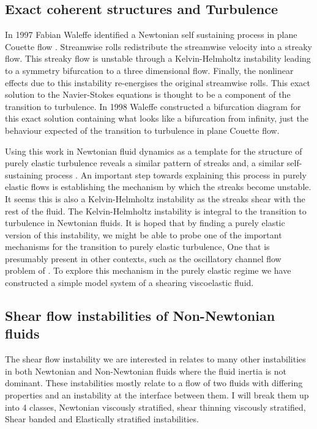 \documentclass{jfm}
\begin{document}
\subsection{Exact coherent structures and Turbulence}

In 1997 Fabian Waleffe identified a Newtonian self sustaining process in plane
Couette flow \citep{Waleffe1997}. Streamwise rolls redistribute the streamwise
velocity into a streaky flow. This streaky flow is unstable through a
Kelvin-Helmholtz instability leading to a symmetry bifurcation to a three
dimensional flow. Finally, the nonlinear effects due to this instability
re-energises the original streamwise rolls. This exact solution to the
Navier-Stokes equations is thought to be a component of the transition to
turbulence. In 1998 Waleffe constructed a bifurcation diagram for this exact
solution \citep{Waleffe1998} containing what looks like a bifurcation from
infinity, just the behaviour expected of the transition to turbulence in plane
Couette flow.

Using this work in Newtonian fluid dynamics as a template for the structure of
purely elastic turbulence reveals a similar pattern of streaks and, a similar
self-sustaining process \citep{Searle2016a}. An important step towards
explaining this process in purely elastic flows is establishing the mechanism
by which the streaks become unstable. It seems this is also a Kelvin-Helmholtz
instability as the streaks shear with the rest of the fluid.  The
Kelvin-Helmholtz instability is integral to the transition to turbulence in
Newtonian fluids. It is hoped that by finding a purely elastic version of this
instability, we might be able to probe one of the important mechanisms for the
transition to purely elastic turbulence, One that is presumably present in
other contexts, such as the oscillatory channel flow problem of
\cite{Searle2016b}. To explore this mechanism in the purely elastic regime we
have constructed a simple model system of a shearing viscoelastic fluid.

\subsection{Shear flow instabilities of Non-Newtonian fluids}

The shear flow instability we are interested in relates to many other
instabilities in both Newtonian and Non-Newtonian fluids where the fluid
inertia is not dominant. These instabilities mostly relate to a flow of two
fluids with differing properties and an instability at the interface between
them. I will break them up into 4 classes, Newtonian viscously stratified, shear
thinning viscously stratified, Shear banded and Elastically stratified
instabilities.
\end{document}
